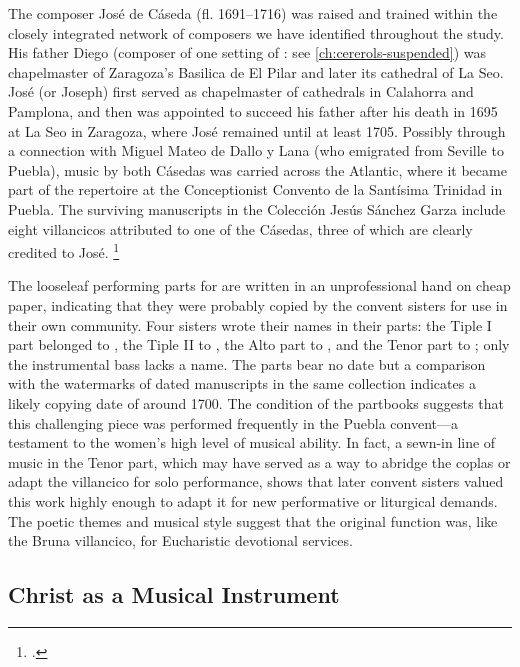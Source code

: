 The composer José de Cáseda (fl. 1691--1716) was raised and trained within the
closely integrated network of composers we have identified throughout the
study.%
    \Autocites
    [120--121]{Calahorra:Zaragoza2}
    {Stevenson:CasedaD}
His father Diego (composer of one setting of : see
\cref{ch:cererols-suspended}) was chapelmaster of Zaragoza's Basilica de El
Pilar and later its cathedral of La Seo.
José (or Joseph) first served as chapelmaster of cathedrals in Calahorra and
Pamplona, and then was appointed to succeed his father after his death in 1695
at La Seo in Zaragoza, where José remained until at least 1705.
Possibly through a connection with Miguel Mateo de Dallo y Lana (who emigrated
from Seville to Puebla), music by both Cásedas was carried across the Atlantic,
where it became part of the repertoire at the Conceptionist Convento de la
Santísima Trinidad in Puebla.
The surviving manuscripts in the Colección Jesús Sánchez Garza include eight
villancicos attributed to one of the Cásedas, three of which are clearly
credited to José.%
    \footnote{.}

The looseleaf performing parts for  are written in an
unprofessional hand on cheap paper, indicating that they were probably copied
by the convent sisters for use in their own community.
Four sisters wrote their names in their parts:
the Tiple I part belonged to , the Tiple II to , the Alto part to , and the Tenor part
to ; only the instrumental bass lacks a name.
The parts bear no date but a comparison with the watermarks of dated
manuscripts in the same collection indicates a likely copying date of around
1700.
The condition of the partbooks suggests that this challenging piece was
performed frequently in the Puebla convent---a testament to the women's high
level of musical ability.%
    \citXXX[cesar]
In fact, a sewn-in line of music in the Tenor part, which may have served as a
way to abridge the coplas or adapt the villancico for solo performance, shows
that later convent sisters valued this work highly enough to adapt it for new
performative or liturgical demands.
The poetic themes and musical style suggest that the original function was,
like the Bruna villancico, for Eucharistic devotional services.


\subsection{Christ as a Musical Instrument}

